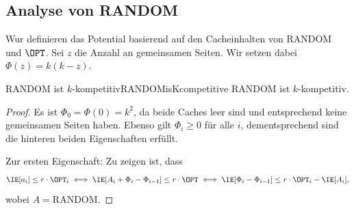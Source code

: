 \documentclass[language=ngerman,algolist]{TemplateLecture}
\begin{document}
\subsection{Analyse von RANDOM}

Wur definieren das Potential basierend auf den Cacheinhalten von RANDOM und $\OPT$. Sei $z$ die Anzahl an gemeinsamen Seiten. Wir setzen dabei $\Phi(z) = k(k-z)$.
\begin{thm}{RANDOM ist $k$-kompetitiv}{RANDOMisKcompetitive}
    RANDOM ist $k$-kompetitiv.
\end{thm}
\begin{proof}
    Es ist $\Phi_0 = \Phi(0) = k^2$, da beide Caches leer sind und entsprechend keine gemeinsamen Seiten haben. Ebenso gilt $\Phi_i \geq 0$ für alle $i$, dementsprechend sind die hinteren beiden Eigenschaften erfüllt.

    Zur ersten Eigenschaft: Zu zeigen ist, dass 
    \begin{equation}
        \IE[a_i] \leq r \cdot \OPT_i \iff \IE[A_i + \Phi_i - \Phi_{i-1}] \leq r \cdot \OPT \iff \IE[\Phi_i - \Phi_{i-1}] \leq r \cdot \OPT_i - \IE[A_i],\label{eq:analysisRANDOM1}
    \end{equation}
    wobei $A = \text{RANDOM}$.


\end{proof}
\end{document}
